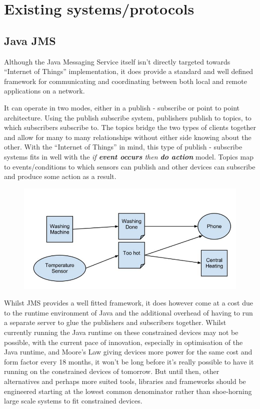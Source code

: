 
\section{Existing systems/protocols} %
\label{sec:existing_systems_protocols}

\subsection{Java JMS} %
\label{sub:java_jms}
Although the Java Messaging Service itself isn't directly targeted towards ``Internet of Things'' implementation, it does provide a standard and well defined framework for communicating and coordinating between both local and remote applications on a network. 

It can operate in two modes, either in a publish - subscribe or point to point architecture. Using the publish subscribe system, publishers publish to topics, to which subscribers subscribe to. The topics bridge the two types of clients together and allow for many to many relationships without either side knowing about the other. With the ``Internet of Things'' in mind, this type of publish - subscribe systems fits in well with the \textit{if \textbf{event occurs} then \textbf{do action}} model. Topics map to events/conditions to which sensors can publish and other devices can subscribe and produce some action as a result.

\begin{figure}[h!]
	\centering
		\includegraphics[scale=0.4]{images/JMS-IoT.jpg}
\end{figure}


Whilst JMS provides a well fitted framework, it does however come at a cost due to the runtime environment of Java and the additional overhead of having to run a separate server to glue the publishers and subscribers together. Whilst currently running the Java runtime on these constrained devices may not be possible, with the current pace of innovation, especially in optimisation of the Java runtime, and Moore's Law giving devices more power for the same cost and form factor every 18 months, it won't be long before it's really possible to have it running on the constrained devices of tomorrow. But until then, other alternatives and perhaps more suited tools, libraries and frameworks should be engineered starting at the lowest common denominator rather than shoe-horning large scale systems to fit constrained devices.


